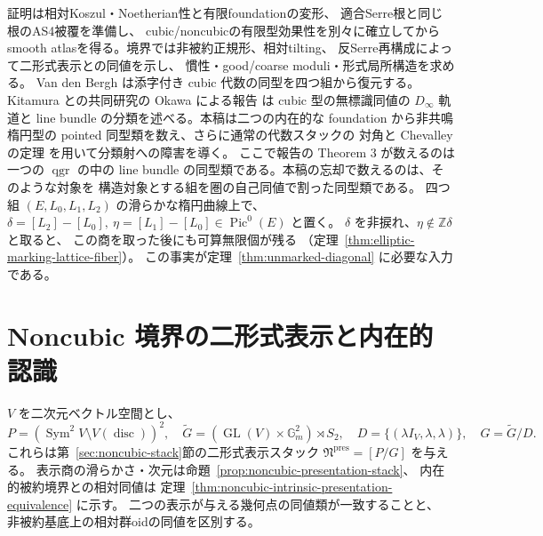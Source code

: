 \documentclass[a4paper,11pt]{ltjsarticle}
\numberwithin{equation}{section}
\theoremstyle{plain}
\theoremstyle{definition}
\theoremstyle{remark}
\begin{document}
証明は相対Koszul・Noetherian性と有限foundationの変形、
適合Serre根と同じ根のAS4被覆を準備し、
cubic/noncubicの有限型効果性を別々に確立してから
smooth atlasを得る。境界では非被約正規形、相対tilting、
反Serre再構成によって二形式表示との同値を示し、
慣性・good/coarse moduli・形式局所構造を求める。
Van den Bergh \cite[arXiv v3, Theorem 5.5.10]{VdB2011} は添字付き cubic
代数の同型を四つ組から復元する。Kitamura との共同研究の Okawa による報告
\cite[Theorems 1, 3]{OkawaKitamura2022OWR} は cubic 型の無標識同値の
$D_\infty$ 軌道と line bundle の分類を述べる。本稿は二つの内在的な
foundation から非共鳴楕円型の pointed 同型類を数え、さらに通常の代数スタックの
対角と Chevalley の定理 \cite[Tags 026N, 04XQ, 0ECX, 04YV]{StacksSmoothAtlas}
を用いて分類射への障害を導く。
ここで報告の Theorem 3 が数えるのは一つの $\operatorname{qgr}$ の中の
line bundle の同型類である。本稿の忘却で数えるのは、そのような対象を
構造対象とする組を圏の自己同値で割った同型類である。
四つ組 $(E,L_0,L_1,L_2)$ の滑らかな楕円曲線上で、
$\delta=[L_2]-[L_0],\ \eta=[L_1]-[L_0]\in\operatorname{Pic}^0(E)$ と置く。
$\delta$ を非捩れ、$\eta\notin\mathbb Z\delta$ と取ると、
この商を取った後にも可算無限個が残る
（定理~\ref{thm:elliptic-marking-lattice-fiber}）。
この事実が定理~\ref{thm:unmarked-diagonal} に必要な入力である。






























\section{Noncubic 境界の二形式表示と内在的認識}\label{sec:moduli-boundary}
$V$ を二次元ベクトル空間とし、
\[
 P=(\operatorname{Sym}^2V\setminus V(\operatorname{disc}))^2,\quad
 \widetilde G=(\operatorname{GL}(V)\times\mathbb G_m^2)\rtimes S_2,\quad
 D=\{(\lambda I_V,\lambda,\lambda)\},\quad G=\widetilde G/D.
\]
これらは第~\ref{sec:noncubic-stack}節の二形式表示スタック
$\mathfrak N^{\mathrm{pres}}=[P/G]$ を与える。
表示商の滑らかさ・次元は命題~\ref{prop:noncubic-presentation-stack}、
内在的被約境界との相対同値は
定理~\ref{thm:noncubic-intrinsic-presentation-equivalence} に示す。
二つの表示が与える幾何点の同値類が一致することと、
非被約基底上の相対群oidの同値を区別する。
\end{document}
